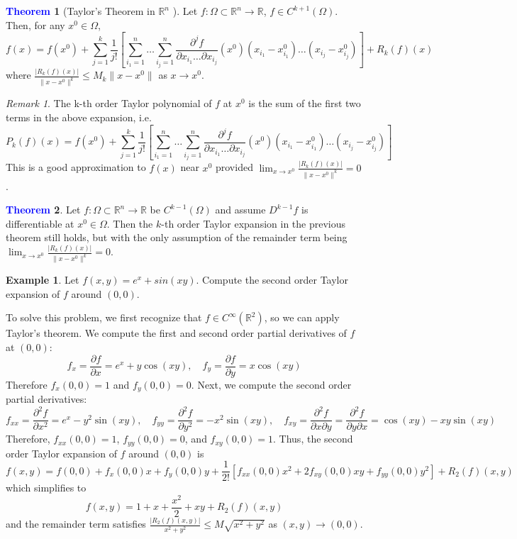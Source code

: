 \documentclass[11pt]{article}
\theoremstyle{definition}
\newtheorem{exmp}{Example}[section]
\theoremstyle{definition}
\newcommand{\R}[0]{\mathbb{R}}
\newcommand{\pdv}[2]{\frac{\partial #1}{\partial #2}}
\newtheorem{theorem}{\textcolor{blue}{Theorem}}
\theoremstyle{definition}
\theoremstyle{remark}
\newtheorem*{remark}{Remark}
\begin{document}
\begin{theorem}[Taylor's Theorem in $\R^n$ ]
    Let $f : \Omega \subset \R^n \to \R$, $f \in C^{k + 1}(\Omega)$. Then, for any 
    $x^0 \in \Omega$,
    \[
        f(x) = f(x^0) + \sum_{j = 1}^k \frac{1}{j!} \left[\sum_{i_1 = 1}^n \dots \sum_{i_j = 1}^n 
        \pdv{^jf}{x_{i_1} \dots \partial x_{i_j}} (x^0) (x_{i_1} - x_{i_1}^0) 
        \dots (x_{i_j} - x_{i_j}^0)\right] + R_k(f)(x)
    \]  
    where $\frac{|R_k(f)(x)|}{\| x - x^0 \|^k } \leq M_k \| x - x^0 \| $ as $x \to x^0$.  
\end{theorem}

\begin{remark}
    The k-th order Taylor polynomial of $f$ at $x^0$ is the sum of the first two terms 
    in the above expansion, i.e. \[P_k(f)(x) = f(x^0) + \sum_{j = 1}^k \frac{1}{j!} 
    \left[\sum_{i_1 = 1}^n \dots \sum_{i_j = 1}^n 
        \pdv{^jf}{x_{i_1} \dots \partial x_{i_j}} (x^0) (x_{i_1} - x_{i_1}^0) 
        \dots (x_{i_j} - x_{i_j}^0)\right]\]
         This is a good approximation to $f(x)$ near $x^0$
        provided $\lim_{x \to x^0} \frac{|R_k(f)(x)|}{\| x - x^0 \|^k } = 0$.   
\end{remark}

\begin{theorem}
    Let $f : \Omega \subset \R^n \to \R$ be $C^{k-1}(\Omega)$ and assume $D^{k-1}f$ is differentiable
    at $x^0 \in \Omega$. Then the $k$-th order Taylor expansion in the previous theorem still holds,
    but with the only assumption of the remainder term being
    $\lim_{x \to x^0} \frac{|R_k(f)(x)|}{\| x - x^0 \|^k } = 0$. 
\end{theorem}

\begin{exmp}
    Let $f(x, y) = e^x + sin(xy)$. Compute the second order Taylor expansion of $f$ around $(0, 0)$.
    
    To solve this problem, we first recognize that $f \in C^\infty(\R^2)$, 
    so we can apply Taylor's theorem. We compute the first and second order partial derivatives of 
    $f$ at $(0, 0)$:
    \[
        f_x = \pdv{f}{x} = e^x + y\cos(xy), \quad f_y = \pdv{f}{y} = x\cos(xy)
    \] 
    Therefore $f_x(0, 0) = 1$ and $f_y(0, 0) = 0$. Next, we compute the second order partial derivatives:
    \[
        f_{xx} = \pdv{^2f}{x^2} = e^x - y^2\sin(xy), \quad f_{yy} = \pdv{^2f}{y^2} = -x^2\sin(xy), 
        \quad f_{xy} = \pdv{^2f}{x\partial y} = \pdv{^2f}{y\partial x} = \cos(xy) - xy\sin(xy)
    \] 
    Therefore, $f_{xx}(0, 0) = 1$, $f_{yy}(0, 0) = 0$, and $f_{xy}(0, 0) = 1$. 
    Thus, the second order Taylor expansion of $f$ around $(0, 0)$ is
    \[
        f(x, y) = f(0, 0) + f_x(0, 0)x + f_y(0, 0)y + \frac{1}{2!}\left[f_{xx}(0, 0)x^2 + 
        2f_{xy}(0, 0)xy + f_{yy}(0, 0)y^2\right] + R_2(f)(x, y)
    \] 
    which simplifies to
    \[
        f(x, y) = 1 + x + \frac{x^2}{2} + xy + R_2(f)(x, y)
    \] 
    and the remainder term satisfies $\frac{|R_2(f)(x, y)|}{x^2 + y^2} \leq M \sqrt{x^2 + y^2}$ as 
    $(x, y) \to (0, 0)$.
\end{exmp}
\end{document}
